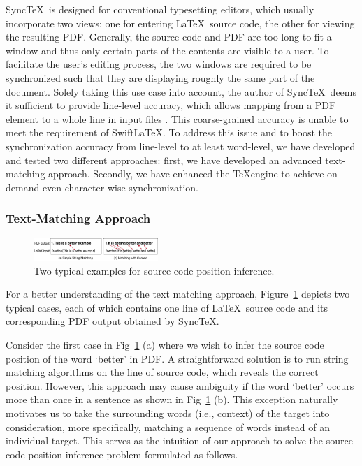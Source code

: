 \documentclass[sigconf]{acmart}
\begin{document}
Sync\TeX\ is  designed for conventional typesetting editors, which usually incorporate two views; 
one for entering \LaTeX\ source code, the other for viewing the resulting PDF. 
Generally, the source code and PDF are too long to fit a window and thus only certain parts of the contents are visible to a user. 
To facilitate the user's editing process, the two windows are required to be synchronized such that they are displaying roughly the same part of the document. 
Solely taking this use case into account, the author of Sync\TeX\ deems it sufficient to provide line-level accuracy, which allows mapping from a PDF element to a whole line in input files \cite{laurens2008direct}. 
This coarse-grained accuracy is unable to meet the requirement of SwiftLaTeX. To address this issue and to boost the synchronization accuracy from line-level to at least  word-level, we have developed and tested two different approaches: first, we have developed an advanced text-matching approach. Secondly, we have enhanced the \TeX engine to achieve on demand even character-wise synchronization.


\subsubsection{Text-Matching Approach}

\begin{figure}[t]
\begin{center}
\includegraphics[width=0.42\textwidth]{figure/charmapping}
\caption{Two typical examples for source code position inference.}
\label{fig:char}
\end{center}

\end{figure}
For a better understanding of the text matching approach, Figure~\ref{fig:char} depicts two typical cases, each of which contains one line of \LaTeX\ source code and its corresponding PDF output obtained by Sync\TeX. 

Consider the first case in Fig~\ref{fig:char} (a) where we wish to infer the source code position of the word `better' in PDF. 
A straightforward solution is to run string matching algorithms on the line of source code, which reveals the correct position. 
However, this approach may cause ambiguity if the word `better' occurs more than once in a sentence as shown in Fig~\ref{fig:char} (b).
This exception naturally motivates us to take the surrounding words (i.e., context) of the target into consideration, more specifically, matching a sequence of words instead of an individual target.
This serves as the intuition of our approach to solve the source code position inference problem formulated as follows.
\end{document}
